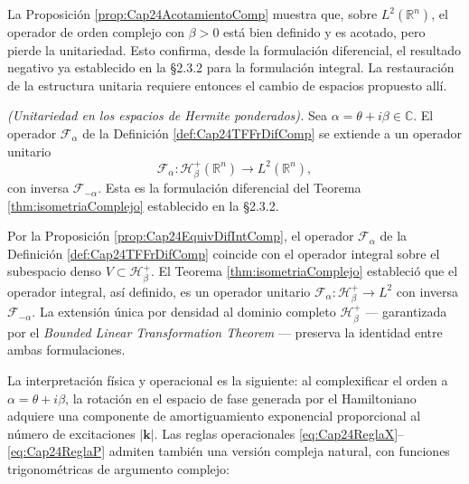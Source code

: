             La Proposición \ref{prop:Cap24AcotamientoComp} muestra que, sobre $L^2(\mathbb{R}^n)$, el operador de orden complejo con $\beta > 0$ está bien definido y es acotado, pero pierde la unitariedad. Esto confirma, desde la formulación diferencial, el resultado negativo ya establecido en la §2.3.2 para la formulación integral. La restauración de la estructura unitaria requiere entonces el cambio de espacios propuesto allí.

            \begin{proposition}\label{prop:Cap24UnitariedadComp}
                \textit{(Unitariedad en los espacios de Hermite ponderados).} Sea $\alpha = \theta + i\beta \in \mathbb{C}$. El operador $\mathcal{F}_\alpha$ de la Definición \ref{def:Cap24TFFrDifComp} se extiende a un operador unitario
                \begin{equation}\label{eq:Cap24UnitariedadComp}
                    \mathcal{F}_\alpha : \mathcal{H}_\beta^+(\mathbb{R}^n) \longrightarrow L^2(\mathbb{R}^n),
                \end{equation}
                con inversa $\mathcal{F}_{-\alpha}$. Esta es la formulación diferencial del Teorema \ref{thm:isometriaComplejo} establecido en la §2.3.2.
            \end{proposition}
            \begin{Proof}
                Por la Proposición \ref{prop:Cap24EquivDifIntComp}, el operador $\mathcal{F}_\alpha$ de la Definición \ref{def:Cap24TFFrDifComp} coincide con el operador integral sobre el subespacio denso $V \subset \mathcal{H}_\beta^+$. El Teorema \ref{thm:isometriaComplejo} estableció que el operador integral, así definido, es un operador unitario $\mathcal{F}_\alpha: \mathcal{H}_\beta^+ \to L^2$ con inversa $\mathcal{F}_{-\alpha}$. La extensión única por densidad al dominio completo $\mathcal{H}_\beta^+$ --- garantizada por el \emph{Bounded Linear Transformation Theorem} \citep[Thm. I.7]{reed1980methods} --- preserva la identidad entre ambas formulaciones.
            \end{Proof}

            La interpretación física y operacional es la siguiente: al complexificar el orden a $\alpha = \theta + i\beta$, la rotación en el espacio de fase generada por el Hamiltoniano adquiere una componente de amortiguamiento exponencial proporcional al número de excitaciones $|\boldsymbol{k}|$. Las reglas operacionales \eqref{eq:Cap24ReglaX}--\eqref{eq:Cap24ReglaP} admiten también una versión compleja natural, con funciones trigonométricas de argumento complejo:

